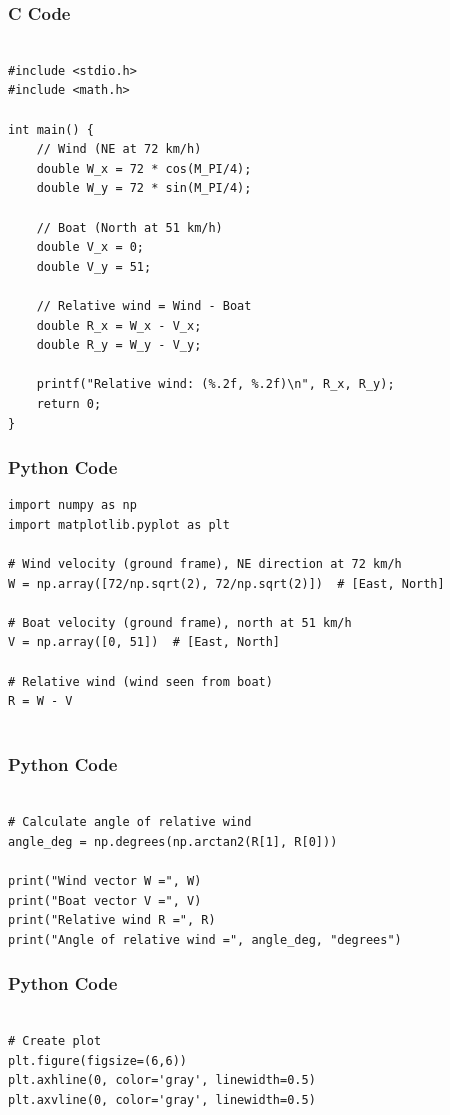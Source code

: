 \documentclass{beamer}
\begin{document}
\begin{frame}[fragile]
    \frametitle{C Code }

    \begin{lstlisting}

#include <stdio.h>
#include <math.h>

int main() {
    // Wind (NE at 72 km/h)
    double W_x = 72 * cos(M_PI/4);
    double W_y = 72 * sin(M_PI/4);

    // Boat (North at 51 km/h)
    double V_x = 0;
    double V_y = 51;

    // Relative wind = Wind - Boat
    double R_x = W_x - V_x;
    double R_y = W_y - V_y;

    printf("Relative wind: (%.2f, %.2f)\n", R_x, R_y);
    return 0;
}
    \end{lstlisting}
\end{frame}

\begin{frame}[fragile]
    \frametitle{Python Code}
    \begin{lstlisting}
import numpy as np
import matplotlib.pyplot as plt

# Wind velocity (ground frame), NE direction at 72 km/h
W = np.array([72/np.sqrt(2), 72/np.sqrt(2)])  # [East, North]

# Boat velocity (ground frame), north at 51 km/h
V = np.array([0, 51])  # [East, North]

# Relative wind (wind seen from boat)
R = W - V


    \end{lstlisting}
\end{frame}

\begin{frame}[fragile]
    \frametitle{Python Code}
    \begin{lstlisting}

# Calculate angle of relative wind
angle_deg = np.degrees(np.arctan2(R[1], R[0]))

print("Wind vector W =", W)
print("Boat vector V =", V)
print("Relative wind R =", R)
print("Angle of relative wind =", angle_deg, "degrees")

    \end{lstlisting}
\end{frame}

\begin{frame}[fragile]
    \frametitle{Python Code}
    \begin{lstlisting}

# Create plot
plt.figure(figsize=(6,6))
plt.axhline(0, color='gray', linewidth=0.5)
plt.axvline(0, color='gray', linewidth=0.5)

    \end{lstlisting}
\end{frame}
\end{document}
